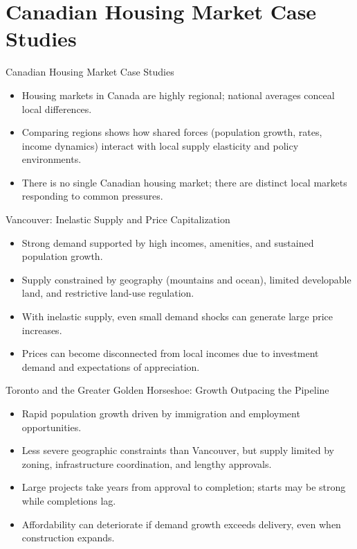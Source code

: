 \documentclass[aspectratio=169]{beamer}
\begin{document}
\section{Canadian Housing Market Case Studies}

\begin{frame}{Canadian Housing Market Case Studies}
\transfade
\begin{itemize}
  \item Housing markets in Canada are highly regional; national averages conceal local differences.
  \item Comparing regions shows how shared forces (population growth, rates, income dynamics) interact with local supply elasticity and policy environments.
  \item There is no single Canadian housing market; there are distinct local markets responding to common pressures.
\end{itemize}
\end{frame}

\begin{frame}{Vancouver: Inelastic Supply and Price Capitalization}
\transfade
\begin{itemize}
  \item Strong demand supported by high incomes, amenities, and sustained population growth.
  \item Supply constrained by geography (mountains and ocean), limited developable land, and restrictive land-use regulation.
  \item With inelastic supply, even small demand shocks can generate large price increases.
  \item Prices can become disconnected from local incomes due to investment demand and expectations of appreciation.
\end{itemize}
\end{frame}

\begin{frame}{Toronto and the Greater Golden Horseshoe: Growth Outpacing the Pipeline}
\transfade
\begin{itemize}
  \item Rapid population growth driven by immigration and employment opportunities.
  \item Less severe geographic constraints than Vancouver, but supply limited by zoning, infrastructure coordination, and lengthy approvals.
  \item Large projects take years from approval to completion; starts may be strong while completions lag.
  \item Affordability can deteriorate if demand growth exceeds delivery, even when construction expands.
\end{itemize}
\end{frame}
\end{document}
